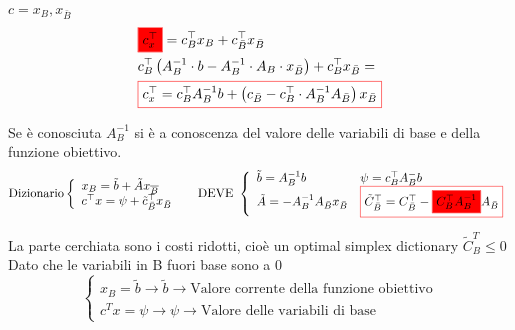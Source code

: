 $c=x_B, x_{\bar{B}}$
$$
\begin{aligned}
    & \fcolorbox{red}{red}{$c^{\top}_x$}=c_B^{\top} x_B+c_{\bar{B}}^{\top} x_{\bar{B}} \\
    & c_B^{\top}\left(A_B^{-1} \cdot b-A_B^{-1} \cdot A_B \cdot x_{\bar{B}} \right)+c_B^{\top} x_{\bar{B}}= \\
    & \fcolorbox{red}{white}{$c_x^{\top} =c_B^{\top} A_B^{-1} b+\left(c_{\bar{B}}-c_B^{\top} \cdot A_B^{-1} A_{\bar{B}}\right) x_{\bar{B}} $}
\end{aligned}
$$

Se è conosciuta $A_B^{-1}$ si è a conoscenza del valore delle variabili 
di base e della funzione obiettivo.
$$
\text{Dizionario} \left\{\begin{array} { l l } { x _ { B } = \tilde { b } + \tilde { A } x _ { \overline { B } } } \\ 
    c^{\top} x=\psi + \tilde{c}^{\top}_{\bar{B}}x_{\bar{B}} \end{array}\right. \quad 
    \text { DEVE } \left\{\begin{array}{ll}\tilde{b}=A_B^{-1} b & \psi=c_B^{\top} A_B^{-} b \\ 
    \tilde{A}=-A^{-1}_BA_{\bar{B}}x_{\bar{B}} & \fcolorbox{red}{white}{$\tilde{C}_{\bar{B}}^{\top}=C_{\bar{B}}^{\top}-
    \fcolorbox{red}{red}{$C_B^{\top} A_B^{-1} $}A_{\bar{B}}$}\end{array}\right. 
$$

La parte cerchiata sono i costi ridotti, cioè un optimal simplex dictionary
 $\tilde{C}^{T}_B \leq 0$
Dato che le variabili in B fuori base sono a 0
$$
\begin{cases*}
    x_B=\tilde{b} \rightarrow \tilde{b} \rightarrow \text{Valore corrente della funzione obiettivo}  \\
    c^T x=\psi \rightarrow \psi \rightarrow \text{Valore delle variabili di base} 
\end{cases*}
$$



